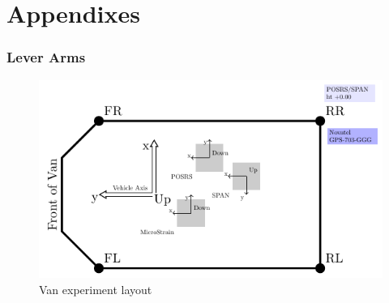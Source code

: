 \documentclass[11pt,fleqn]{book} %
\begin{document}
\renewcommand\thesection{\Alph{section}}
\renewcommand{\thepart}{\Alph{part}}
\setcounter{part}{0}
\setcounter{chapter}{1}
\setcounter{section}{0}
\part{Appendixes}



\section{Lever Arms}

\begin{figure}[!htb]
\centering\includegraphics[clip,width=16cm]{pic/VanLayout}%
\caption{Van experiment layout\label{fig:Van-experiment-layout}}
\end{figure}
\end{document}
